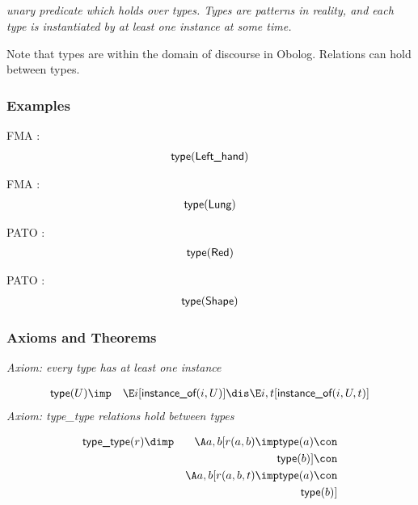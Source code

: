 \subsection{ }
\emph{unary predicate which holds over types. Types are patterns in reality, and each type is instantiated by at least one instance at some time.}

Note that types are within the domain of discourse in Obolog. Relations can hold between types.

\subsubsection{Examples}
\begin{clist}
\item FMA : \begin{eqnarray*}
 \mbox{\sf type}( \mbox{\sf Left\_hand}) 
\end{eqnarray*}

\item FMA : \begin{eqnarray*}
 \mbox{\sf type}( \mbox{\sf Lung}) 
\end{eqnarray*}

\item PATO : \begin{eqnarray*}
 \mbox{\sf type}( \mbox{\sf Red}) 
\end{eqnarray*}

\item PATO : \begin{eqnarray*}
 \mbox{\sf type}( \mbox{\sf Shape}) 
\end{eqnarray*}

\end{clist}

\subsubsection{Axioms and Theorems}


\emph{Axiom: every type has at least one instance}

\begin{eqnarray*}
 \pr{type}(U) &\imp & \E i[ \pr{instance\_of}(i, U) ]\dis  \E i, t[ \pr{instance\_of}(i, U, t) ]
\end{eqnarray*}
\emph{Axiom: type\_type relations hold between types}

\begin{eqnarray*}
 \pr{type\_type}(r) &\dimp & \A a, b[r(a, b) \imp  \pr{type}(a) \con \\
&& \pr{type}(b) ]\con \\
&& \A a, b[r(a, b, t) \imp  \pr{type}(a) \con \\
&& \pr{type}(b) ]
\end{eqnarray*}

